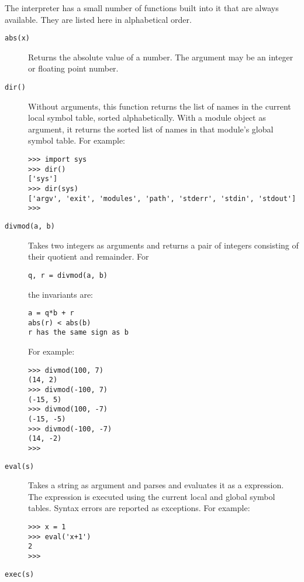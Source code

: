 The {\Python} interpreter has a small number of functions built into it that
are always available.
They are listed here in alphabetical order.
\begin{description}
\item[{\tt abs(x)}]
Returns the absolute value of a number.
The argument may be an integer or floating point number.
\item[{\tt dir()}]
Without arguments, this function returns the list of names in the
current local symbol table, sorted alphabetically.
With a module object as argument, it returns the sorted list of names in
that module's global symbol table.
For example:
\begin{code}\begin{verbatim}
>>> import sys
>>> dir()
['sys']
>>> dir(sys)
['argv', 'exit', 'modules', 'path', 'stderr', 'stdin', 'stdout']
>>> 
\end{verbatim}\end{code}
\item[{\tt divmod(a, b)}]
Takes two integers as arguments and returns a pair of integers
consisting of their quotient and remainder.
For
\begin{code}\begin{verbatim}
q, r = divmod(a, b)
\end{verbatim}\end{code}
the invariants are:
\begin{code}\begin{verbatim}
a = q*b + r
abs(r) < abs(b)
r has the same sign as b
\end{verbatim}\end{code}
For example:
\begin{code}\begin{verbatim}
>>> divmod(100, 7)
(14, 2)
>>> divmod(-100, 7)
(-15, 5)
>>> divmod(100, -7)
(-15, -5)
>>> divmod(-100, -7)
(14, -2)
>>> 
\end{verbatim}\end{code}
\item[{\tt eval(s)}]
Takes a string as argument and parses and evaluates it as a {\Python}
expression.
The expression is executed using the current local and global symbol
tables.
Syntax errors are reported as exceptions.
For example:
\begin{code}\begin{verbatim}
>>> x = 1
>>> eval('x+1')
2
>>> 
\end{verbatim}\end{code}
\item[{\tt exec(s)}]

\end{description}
